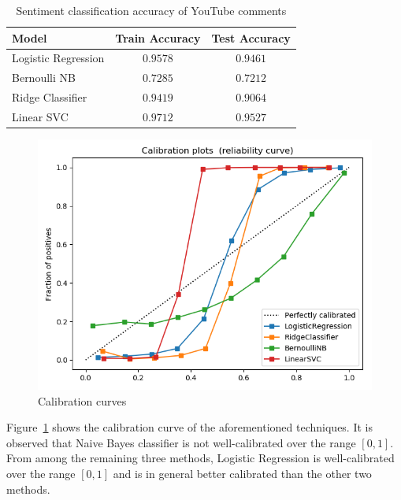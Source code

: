 \begin{table}%
\centering
\begin{tabular}{|l|c|c|}
\hline
Model & Train Accuracy & Test Accuracy \\
\hline
Logistic Regression & $0.9578$ & $0.9461$ \\
\hline
Bernoulli NB & $0.7285$ & $0.7212$ \\
\hline
Ridge Classifier & $0.9419$ & $0.9064$ \\
\hline
Linear SVC & $0.9712$ & $0.9527$ \\
\hline
\end{tabular}
\caption{Sentiment classification accuracy of YouTube comments}
\label{tab:accuracy}
\end{table}

\begin{figure}%
\centering
\includegraphics[width=1.0\columnwidth]{figures/calibration.png}%
\caption{Calibration curves}%
\label{fig:calibration}%
\end{figure}

Figure~\ref{fig:calibration} shows the calibration curve of the aforementioned techniques. It is observed that Naive Bayes classifier is not well-calibrated over the range $[0,1]$. From among the remaining three methods, Logistic Regression is well-calibrated over the range $[0,1]$ and is in general better calibrated than the other two methods.

